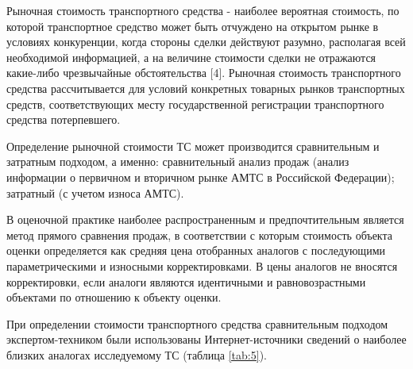 \par \indent Рыночная стоимость транспортного средства - наиболее вероятная стоимость, по которой транспортное средство может быть отчуждено на открытом рынке в условиях конкуренции, когда стороны сделки действуют разумно, располагая всей необходимой информацией, а на величине стоимости сделки не отражаются какие-либо чрезвычайные обстоятельства [4]. Рыночная стоимость транспортного средства  рассчитывается  для условий конкретных товарных рынков транспортных средств, соответствующих месту государственной регистрации транспортного средства потерпевшего.
\par Определение рыночной стоимости ТС может производится сравнительным и затратным подходом, а именно:  сравнительный анализ продаж (анализ информации о первичном и вторичном рынке АМТС в Российской Федерации);  затратный (с учетом износа АМТС).
\par В оценочной практике наиболее распространенным и предпочтительным является метод прямого сравнения продаж, в соответствии с которым стоимость объекта оценки определяется как средняя цена отобранных аналогов с последующими параметрическими и износными корректировками.   В цены аналогов не вносятся корректировки, если аналоги являются идентичными и равновозрастными объектами по отношению к объекту оценки. 

% 
   
При определении стоимости транспортного средства сравнительным подходом экспертом-техником были использованы  Интернет-источники сведений о наиболее близких  аналогах исследуемому ТС (таблица \ref{tab:5}). 
 

